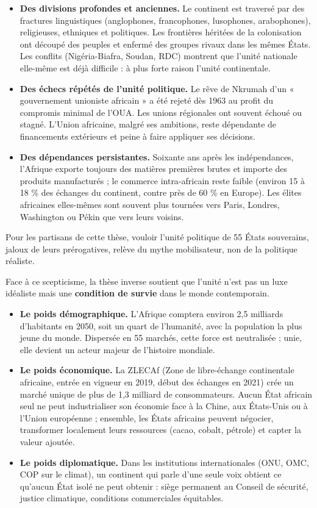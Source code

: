 \documentclass[11pt]{article}
\newcounter{popsec}
\newcounter{popsub}
\newcommand{\courssub}[1]{%
  \stepcounter{popsub}%
  \par\vspace{9pt}\noindent{\popxbold\fontsize{11.5}{13}\selectfont\color{popink}{\color{poporange}\thepopsec.\thepopsub}\hspace{6pt}#1}\par\nopagebreak\vspace{4pt}
}
\begin{document}
\begin{itemize}
\item \textbf{Des divisions profondes et anciennes.} Le continent est traversé par des fractures linguistiques (anglophones, francophones, lusophones, arabophones), religieuses, ethniques et politiques. Les frontières héritées de la colonisation ont découpé des peuples et enfermé des groupes rivaux dans les mêmes États. Les conflits (Nigéria-Biafra, Soudan, RDC) montrent que l'unité nationale elle-même est déjà difficile : à plus forte raison l'unité continentale.
\item \textbf{Des échecs répétés de l'unité politique.} Le rêve de Nkrumah d'un « gouvernement unioniste africain » a été rejeté dès 1963 au profit du compromis minimal de l'OUA. Les unions régionales ont souvent échoué ou stagné. L'Union africaine, malgré ses ambitions, reste dépendante de financements extérieurs et peine à faire appliquer ses décisions.
\item \textbf{Des dépendances persistantes.} Soixante ans après les indépendances, l'Afrique exporte toujours des matières premières brutes et importe des produits manufacturés ; le commerce intra-africain reste faible (environ 15 à 18 \% des échanges du continent, contre près de 60 \% en Europe). Les élites africaines elles-mêmes sont souvent plus tournées vers Paris, Londres, Washington ou Pékin que vers leurs voisins.
\end{itemize}

Pour les partisans de cette thèse, vouloir l'unité politique de 55 États souverains, jaloux de leurs prérogatives, relève du mythe mobilisateur, non de la politique réaliste.

\courssub{Deuxième thèse : le panafricanisme est une nécessité}

Face à ce scepticisme, la thèse inverse soutient que l'unité n'est pas un luxe idéaliste mais une \textbf{condition de survie} dans le monde contemporain.

\begin{itemize}
\item \textbf{Le poids démographique.} L'Afrique comptera environ 2,5 milliards d'habitants en 2050, soit un quart de l'humanité, avec la population la plus jeune du monde. Dispersée en 55 marchés, cette force est neutralisée ; unie, elle devient un acteur majeur de l'histoire mondiale.
\item \textbf{Le poids économique.} La ZLECAf (Zone de libre-échange continentale africaine, entrée en vigueur en 2019, début des échanges en 2021) crée un marché unique de plus de 1,3 milliard de consommateurs. Aucun État africain seul ne peut industrialiser son économie face à la Chine, aux États-Unis ou à l'Union européenne ; ensemble, les États africains peuvent négocier, transformer localement leurs ressources (cacao, cobalt, pétrole) et capter la valeur ajoutée.
\item \textbf{Le poids diplomatique.} Dans les institutions internationales (ONU, OMC, COP sur le climat), un continent qui parle d'une seule voix obtient ce qu'aucun État isolé ne peut obtenir : siège permanent au Conseil de sécurité, justice climatique, conditions commerciales équitables.
\end{itemize}
\end{document}
